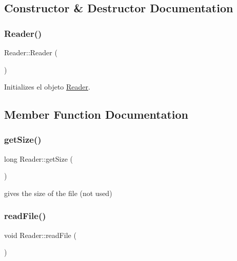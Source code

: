 \subsection{Constructor \& Destructor Documentation}
\mbox{\label{classReader_adcda31b507720ab44044d7a21686fba2}} 
\subsubsection{\texorpdfstring{Reader()}{Reader()}}
{\footnotesize\ttfamily Reader\+::\+Reader (\begin{DoxyParamCaption}{ }\end{DoxyParamCaption})}



Initializes el objeto \mbox{\hyperlink{classReader}{Reader}}. 



\subsection{Member Function Documentation}
\mbox{\label{classReader_aeaafb1c474105dd5fed7bdbdefe1c0a7}} 
\subsubsection{\texorpdfstring{get\+Size()}{getSize()}}
{\footnotesize\ttfamily long Reader\+::get\+Size (\begin{DoxyParamCaption}{ }\end{DoxyParamCaption})}



gives the size of the file (not used) 

\mbox{\label{classReader_ab8c747ff4741efb08203f80013d391d6}} 
\subsubsection{\texorpdfstring{read\+File()}{readFile()}}
{\footnotesize\ttfamily void Reader\+::read\+File (\begin{DoxyParamCaption}{ }\end{DoxyParamCaption})}



